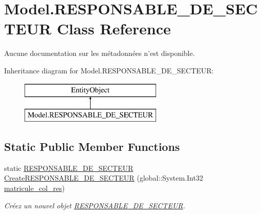 \hypertarget{class_model_1_1_r_e_s_p_o_n_s_a_b_l_e___d_e___s_e_c_t_e_u_r}{\section{Model.\-R\-E\-S\-P\-O\-N\-S\-A\-B\-L\-E\-\_\-\-D\-E\-\_\-\-S\-E\-C\-T\-E\-U\-R Class Reference}
\label{class_model_1_1_r_e_s_p_o_n_s_a_b_l_e___d_e___s_e_c_t_e_u_r}
}


Aucune documentation sur les métadonnées n'est disponible.  


Inheritance diagram for Model.\-R\-E\-S\-P\-O\-N\-S\-A\-B\-L\-E\-\_\-\-D\-E\-\_\-\-S\-E\-C\-T\-E\-U\-R\-:\begin{figure}[H]
\begin{center}
\leavevmode
\includegraphics[height=2.000000cm]{class_model_1_1_r_e_s_p_o_n_s_a_b_l_e___d_e___s_e_c_t_e_u_r}
\end{center}
\end{figure}
\subsection*{Static Public Member Functions}
\begin{DoxyCompactItemize}
\item 
static \hyperlink{class_model_1_1_r_e_s_p_o_n_s_a_b_l_e___d_e___s_e_c_t_e_u_r}{R\-E\-S\-P\-O\-N\-S\-A\-B\-L\-E\-\_\-\-D\-E\-\_\-\-S\-E\-C\-T\-E\-U\-R} \hyperlink{class_model_1_1_r_e_s_p_o_n_s_a_b_l_e___d_e___s_e_c_t_e_u_r_a3923912985db6f098b460f54562e386f}{Create\-R\-E\-S\-P\-O\-N\-S\-A\-B\-L\-E\-\_\-\-D\-E\-\_\-\-S\-E\-C\-T\-E\-U\-R} (global\-::\-System.\-Int32 \hyperlink{class_model_1_1_r_e_s_p_o_n_s_a_b_l_e___d_e___s_e_c_t_e_u_r_af326e57ab9a6b071e90fdc7397891569}{matricule\-\_\-col\-\_\-res})
\begin{DoxyCompactList}\small\item\em Créez un nouvel objet \hyperlink{class_model_1_1_r_e_s_p_o_n_s_a_b_l_e___d_e___s_e_c_t_e_u_r}{R\-E\-S\-P\-O\-N\-S\-A\-B\-L\-E\-\_\-\-D\-E\-\_\-\-S\-E\-C\-T\-E\-U\-R}. \end{DoxyCompactList}\end{DoxyCompactItemize}

